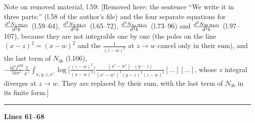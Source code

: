 \documentclass[10pt]{article}
\newenvironment{notebox}{\def\FrameCommand{{\color{notebar}\vrule width 1.5pt}\hspace{6pt}}\MakeFramed{\advance\hsize-\width\FrameRestore}\small}{\endMakeFramed}
\begin{document}
\begin{notebox}\textsf{\small Note on removed material, l.59:} [Removed here: the sentence ``We write it in three parts:'' (l.58 of the author's file) and the four separate equations for $\frac{d^{3}N_{1\,\rm NLO}}{d^{3}k}$ (l.59--64), $\frac{d^{3}N_{2\,\rm NLO}}{d^{3}k}$ (l.65--72), $\frac{d^{3}N_{3a\,\rm NLO}}{d^{3}k}$ (l.73--96) and $\frac{d^{3}N_{3b\,\rm NLO}}{d^{3}k}$ (l.97--107), because they are not integrable one by one (the poles on the line $(x-z)^{2}=(x-w)^{2}$ and the $\frac{1}{(z-w)^{2}}$ at $z\to w$ cancel only in their sum), and the last term of $N_{3b}$ (l.106), $-\frac{ig^{4}f^{abd}}{16\pi^{5}}\frac{1}{k^{+}}\int_{x,y,z,x'}\log\big[\frac{(z-w)^{2}}{(x-w)^{2}}\big]\frac{(x'-w')\cdot(y-z)}{(x'-w')^{2}(y-z)^{2}(z-w)^{2}}[\dots][\dots]$, whose $z$ integral diverges at $z\to w$. They are replaced by their sum, with the last term of $N_{3b}$ in its finite form.]\end{notebox}
\par
{}\noindent\rule{\linewidth}{0.3pt}\par\noindent\textbf{Lines 61--68} \par
\end{document}
